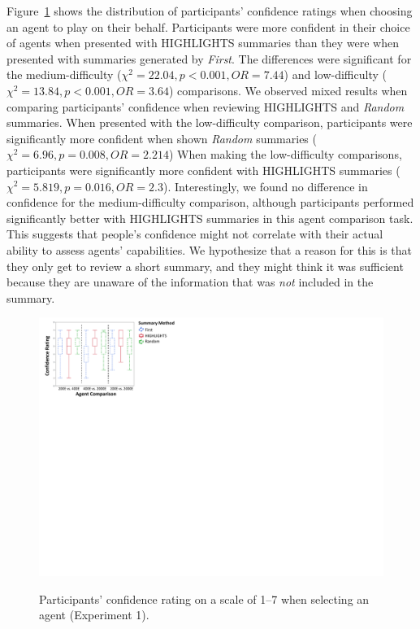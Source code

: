 Figure~\ref{fig:highlightsConf} shows the distribution of participants' confidence ratings when choosing an agent to play on their behalf. Participants were more confident in their choice of agents when presented with HIGHLIGHTS summaries than they were when presented with summaries generated by \emph{First}. The differences were significant for the medium-difficulty ($\chi^2=22.04, p<0.001, OR = 7.44$) and low-difficulty ($\chi^2=13.84, p<0.001, OR = 3.64$) comparisons. We observed mixed results when comparing participants' confidence when reviewing HIGHLIGHTS and \emph{Random} summaries. When presented with the low-difficulty comparison, participants were significantly more confident when shown \emph{Random} summaries ($\chi^2=6.96, p=0.008, OR = 2.214$)
When making the low-difficulty comparisons, participants were significantly more confident with HIGHLIGHTS summaries ($\chi^2=5.819, p=0.016, OR = 2.3$). Interestingly, we found no difference in confidence for the medium-difficulty comparison, although participants performed significantly better with HIGHLIGHTS summaries in this agent comparison task. This suggests that people's confidence might not correlate with their actual ability to assess agents' capabilities. We hypothesize that a reason for this is that they only get to review a short summary, and they might think it was sufficient because they are unaware of the information that was \emph{not} included in the summary.



\begin{figure}[h]
	\includegraphics[width=0.89\columnwidth]{figs/confidenceExp1figForPaper.pdf}\\
	\caption{Participants' confidence rating on a scale of 1--7 when selecting an agent (Experiment 1).}
	\label{fig:highlightsConf}
	\vspace{-0.3cm}
\end{figure}


